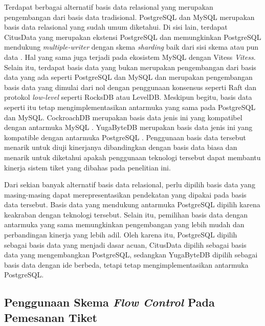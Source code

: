 Terdapat berbagai alternatif basis data relasional yang merupakan pengembangan dari basis data tradisional. PostgreSQL dan MySQL merupakan basis data relasional yang sudah umum diketahui. Di sisi lain, terdapat CitusData yang merupakan ekstensi PostgreSQL dan memungkinkan PostgreSQL mendukung \textit{multiple-writer} dengan skema \textit{sharding} baik dari sisi skema atau pun data \parencite{citus}. Hal yang sama juga terjadi pada ekosistem MySQL dengan Vitess \textit{Vitess}. Selain itu, terdapat basis data yang bukan merupakan pengembangan dari basis data yang ada seperti PostgreSQL dan MySQL dan merupakan pengembangan basis data yang dimulai dari nol dengan penggunaan konsensus seperti Raft dan protokol \textit{low-level} seperti RocksDB atau LevelDB. Meskipun begitu, basis data seperti itu tetap mengimplementasikan antarmuka yang sama pada PostgreSQL dan MySQL. CockroachDB merupakan basis data jenis ini yang kompatibel dengan antarmuka MySQL \parencite{cockroachDB}. YugaByteDB merupakan basis data jenis ini yang kompatible dengan antarmuka PostgreSQL \parencite{yugabyte}. Penggunaan basis data tersebut menarik untuk diuji kinerjanya dibandingkan dengan basis data biasa dan menarik untuk diketahui apakah penggunaan teknologi tersebut dapat membantu kinerja sistem tiket yang dibahas pada penelitian ini.

Dari sekian banyak alternatif basis data relasional, perlu dipilih basis data yang masing-masing dapat merepresentasikan pendekatan yang dipakai pada basis data tersebut. Basis data yang mendukung antarmuka PostgreSQL dipilih karena keakraban dengan teknologi tersebut. Selain itu, pemilihan basis data dengan antarmuka yang sama memungkinkan pengembangan yang lebih mudah dan perbandingan kinerja yang lebih adil. Oleh karena itu, PostgreSQL dipilih sebagai basis data yang menjadi dasar acuan, CitusData dipilih sebagai basis data yang mengembangkan PostgreSQL, sedangkan YugaByteDB dipilih sebagai basis data dengan ide berbeda, tetapi tetap mengimplementasikan antarmuka PostgreSQL.

\subsection{Penggunaan Skema \textit{Flow Control} Pada Pemesanan Tiket}

